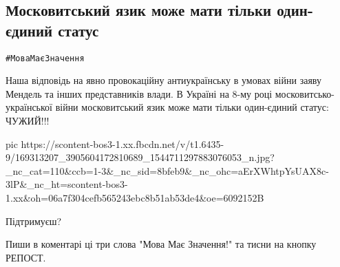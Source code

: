  
 
 
 
 

\subsection{Московитський язик може мати тільки один-єдиний статус}

\verb|#МоваМаєЗначення|

Наша відповідь на явно провокаційну антиукраїнську в умовах війни заяву Мендель
та інших представників влади.  В Україні на 8-му році московитсько-української
війни московитський язик може мати тільки один-єдиний статус: ЧУЖИЙ!!!

\ifcmt
  pic https://scontent-bos3-1.xx.fbcdn.net/v/t1.6435-9/169313207_3905604172810689_1544711297883076053_n.jpg?_nc_cat=110&ccb=1-3&_nc_sid=8bfeb9&_nc_ohc=aErXWhtpYsUAX8c-3lP&_nc_ht=scontent-bos3-1.xx&oh=06a7f304cefb565243ebc8b51ab53de4&oe=6092152B
\fi

Підтримуєш?

Пиши в коментарі ці три слова "Мова Має Значення!" та тисни на кнопку РЕПОСТ.

